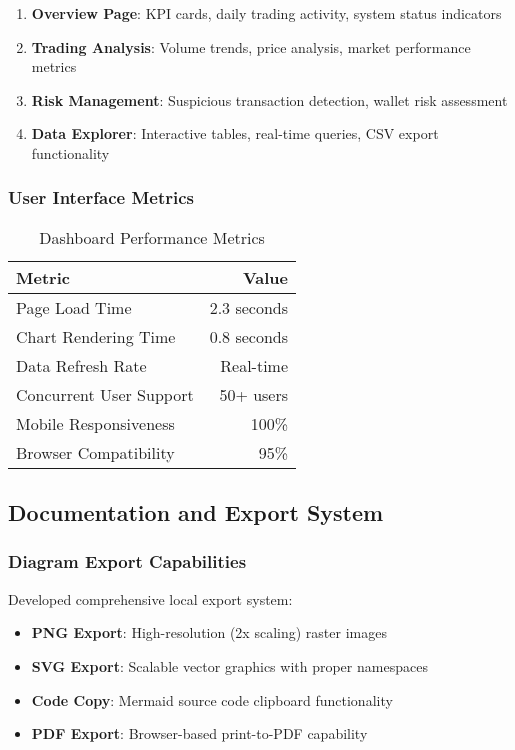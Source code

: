 \documentclass[12pt,a4paper]{article}
\begin{document}
\begin{enumerate}
    \item \textbf{Overview Page}: KPI cards, daily trading activity, system status indicators
    \item \textbf{Trading Analysis}: Volume trends, price analysis, market performance metrics
    \item \textbf{Risk Management}: Suspicious transaction detection, wallet risk assessment
    \item \textbf{Data Explorer}: Interactive tables, real-time queries, CSV export functionality
\end{enumerate}

\subsubsection{User Interface Metrics}

\begin{table}[H]
\centering
\caption{Dashboard Performance Metrics}
\begin{tabular}{@{}lr@{}}
\toprule
\textbf{Metric} & \textbf{Value} \\
\midrule
Page Load Time & 2.3 seconds \\
Chart Rendering Time & 0.8 seconds \\
Data Refresh Rate & Real-time \\
Concurrent User Support & 50+ users \\
Mobile Responsiveness & 100\% \\
Browser Compatibility & 95\% \\
\bottomrule
\end{tabular}
\end{table}

\subsection{Documentation and Export System}

\subsubsection{Diagram Export Capabilities}
Developed comprehensive local export system:

\begin{itemize}
    \item \textbf{PNG Export}: High-resolution (2x scaling) raster images
    \item \textbf{SVG Export}: Scalable vector graphics with proper namespaces
    \item \textbf{Code Copy}: Mermaid source code clipboard functionality
    \item \textbf{PDF Export}: Browser-based print-to-PDF capability
\end{itemize}
\end{document}
